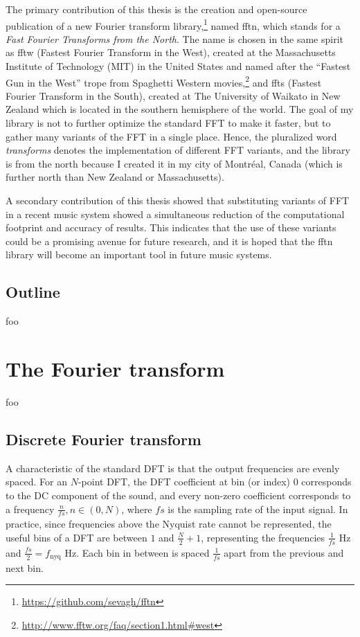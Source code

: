 \documentclass[letter,12pt,notitlepage]{article}
\begin{document}
The primary contribution of this thesis is the creation and open-source publication of a new Fourier transform library,\footnote{\href{https://github.com/sevagh/fftn}{https://github.com/sevagh/fftn}} named fftn, which stands for a \textit{Fast Fourier Transforms from the North}. The name is chosen in the same spirit as fftw\cite{fftw} (Fastest Fourier Transform in the West), created at the Massachusetts Institute of Technology (MIT) in the United States and named after the ``Fastest Gun in the West'' trope from Spaghetti Western movies,\footnote{\href{http://www.fftw.org/faq/section1.html\#west}{http://www.fftw.org/faq/section1.html\#west}} and ffts\cite{ffts} (Fastest Fourier Transform in the South), created at The University of Waikato in New Zealand which is located in the southern hemisphere of the world. The goal of my library is not to further optimize the standard FFT to make it faster, but to gather many variants of the FFT in a single place. Hence, the pluralized word \textit{transforms} denotes the implementation of different FFT variants, and the library is from the north because I created it in my city of Montr{\'e}al, Canada (which is further north than New Zealand or Massachusetts).

A secondary contribution of this thesis showed that substituting variants of FFT in a recent music system  showed a simultaneous reduction of the computational footprint and accuracy of results. This indicates that the use of these variants could be a promising avenue for future research, and it is hoped that the fftn library will become an important tool in future music systems.

\subsection{Outline}

foo

\section{The Fourier transform}

foo

\subsection{Discrete Fourier transform}

A characteristic of the standard DFT is that the output frequencies are evenly spaced. For an $N$-point DFT, the DFT coefficient at bin (or index) 0 corresponds to the DC component of the sound, and every non-zero coefficient corresponds to a frequency $\frac{n}{\mathit{fs}}, n \in (0, N)$, where $\mathit{fs}$ is the sampling rate of the input signal. In practice, since frequencies above the Nyquist rate cannot be represented, the useful bins of a DFT are between $1$ and $\frac{N}{2}+1$, representing the frequencies $\frac{1}{\mathit{fs}}$ Hz and $\frac{\mathit{fs}}{2} = f_{\text{nyq}}$ Hz. Each bin in between is spaced $\frac{1}{\mathit{fs}}$ apart from the previous and next bin.
\end{document}
